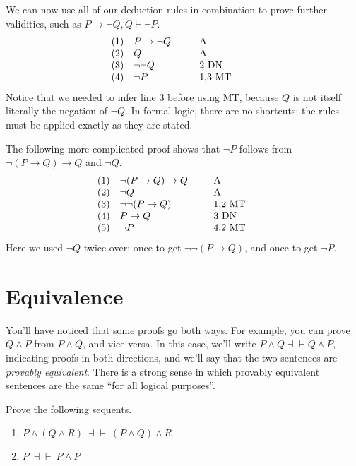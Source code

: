 We can now use all of our deduction rules in combination to prove
further validities, such
as $P\to\neg Q,Q\vdash \neg P$.
\[ \begin{array}{l >{$}p{2cm}<{$} p{2cm}}
     (1) & P\to \neg Q    & A \\
     (2) & Q              & A \\
     (3) & \neg \neg Q    & 2 DN \\
     (4) & \neg P         & 1,3 MT \end{array} \]
Notice that we needed to infer line $3$ before using MT, 
because $Q$ is not itself literally the negation of $\neg Q$. In
formal logic, there are no shortcuts; the rules must be applied
exactly as they are stated.

The following more complicated proof shows that $\neg P$ follows from
$\neg (P\to Q)\to Q$ and $\neg Q$.
\[ \begin{array}{l >{$}p{3cm}<{$} p{2cm}}
     (1) & \neg (P\to Q)\to Q  & A \\
     (2) & \neg Q              & A \\
     (3) & \neg\neg (P\to Q)   & 1,2 MT \\
     (4) & P\to Q              & 3 DN \\
     (5) & \neg P              & 4,2 MT 
   \end{array} \]
Here we used $\neg Q$ twice over: once to get $\neg\neg (P\to Q)$, and
once to get $\neg P$.

\section{Equivalence}

You'll have noticed that some proofs go both ways.  For example, you
can prove $Q\wedge P$ from $P\wedge Q$, and vice versa.  In this case,
we'll write $P\wedge Q\dashv\vdash Q\wedge P$, indicating proofs in
both directions, and we'll say that the two sentences are
\emph{provably equivalent}.  There is a strong sense in which provably
equivalent sentences are the same ``for all logical purposes''.

\begin{exercise} Prove the following sequents.
  \begin{enumerate} \item $P\wedge (Q\wedge R)\:\dashv\vdash\:
  (P\wedge Q)\wedge R$ \item $P\:\dashv\vdash\: P\wedge
  P$ \end{enumerate} \end{exercise}

